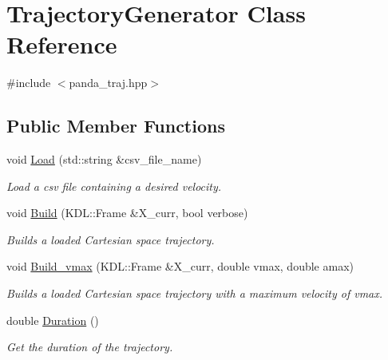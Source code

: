 \hypertarget{class_trajectory_generator}{}\section{Trajectory\+Generator Class Reference}
\label{class_trajectory_generator}


{\ttfamily \#include $<$panda\+\_\+traj.\+hpp$>$}

\subsection*{Public Member Functions}
\begin{DoxyCompactItemize}
\item 
void \hyperlink{class_trajectory_generator_a75892c486572ad0820d2a377472c0c14}{Load} (std\+::string \&csv\+\_\+file\+\_\+name)
\begin{DoxyCompactList}\small\item\em Load a csv file containing a desired velocity. \end{DoxyCompactList}\item 
void \hyperlink{class_trajectory_generator_ae74c9669e7b82cbd16d717b67a67bfab}{Build} (K\+D\+L\+::\+Frame \&X\+\_\+curr, bool verbose)
\begin{DoxyCompactList}\small\item\em Builds a loaded Cartesian space trajectory. \end{DoxyCompactList}\item 
void \hyperlink{class_trajectory_generator_a3a2299cadddd64978bd4cf3261df2c6d}{Build\+\_\+vmax} (K\+D\+L\+::\+Frame \&X\+\_\+curr, double vmax, double amax)
\begin{DoxyCompactList}\small\item\em Builds a loaded Cartesian space trajectory with a maximum velocity of vmax. \end{DoxyCompactList}\item 
\mbox{\label{class_trajectory_generator_acedf42df64761b53488d043eeafbf6fa}} 
double \hyperlink{class_trajectory_generator_acedf42df64761b53488d043eeafbf6fa}{Duration} ()
\begin{DoxyCompactList}\small\item\em Get the duration of the trajectory. \end{DoxyCompactList}\item 
\mbox{\label{class_trajectory_generator_a5ad2939e56c676d8643ac2410a896304}} 

\end{DoxyCompactItemize}
